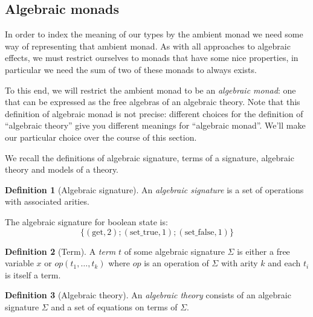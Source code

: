 \documentclass[acmsmall, screen, nonacm]{acmart}
\theoremstyle{definition}
\newtheorem{definition}{Definition}[section]
\begin{document}
\subsection{Algebraic monads}

In order to index the meaning of our types by the ambient monad we need
some way of representing that ambient monad. As with all approaches to
algebraic effects, we must restrict ourselves to monads that have some
nice properties, in particular we need the sum of two of these monads to
always exists.

To this end, we will restrict the ambient monad to be an \emph{algebraic
  monad}: one that can be expressed as the free algebras of an algebraic
theory. Note that this definition of algebraic monad is not precise:
different choices for the definition of ``algebraic theory'' give you
different meanings for ``algebraic monad''. We'll make our particular
choice over the course of this section.

We recall the definitions of algebraic signature, terms of a signature,
algebraic theory and models of a theory.
\begin{definition}[Algebraic signature]
  An \emph{algebraic signature} is a set of operations with associated
  arities.
\end{definition}

\begin{example}
  The algebraic signature for boolean state is:
  \begin{equation*}
    \{ (\mathrm{get}, 2); (\mathrm{set\_true}, 1); (\mathrm{set\_false}, 1) \}
  \end{equation*}
\end{example}

\begin{definition}[Term]
  A \emph{term} $t$ of some algebraic signature $\Sigma$ is either a
  free variable $x$ or $op(t_1, \ldots, t_k)$ where $op$ is an operation
  of $\Sigma$ with arity $k$ and each $t_i$ is itself a term.
\end{definition}

\begin{definition}[Algebraic theory]
  An \emph{algebraic theory} consists of an algebraic signature $\Sigma$ and a set of
  equations on terms of $\Sigma$.
\end{definition}
\end{document}
